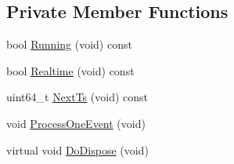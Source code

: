 \subsection*{Private Member Functions}
\begin{DoxyCompactItemize}
\item 
bool \hyperlink{classns3_1_1RealtimeSimulatorImpl_a02df477b10554442ed9d5049f9fca6ad}{Running} (void) const 
\item 
bool \hyperlink{classns3_1_1RealtimeSimulatorImpl_a1af563c7102edb90411971d8b1729488}{Realtime} (void) const 
\item 
uint64\+\_\+t \hyperlink{classns3_1_1RealtimeSimulatorImpl_ad2666b69c7f58599a68771e9d1544d26}{Next\+Ts} (void) const 
\item 
void \hyperlink{classns3_1_1RealtimeSimulatorImpl_ad30d0398ff4f58cb4896337169732c72}{Process\+One\+Event} (void)
\item 
virtual void \hyperlink{classns3_1_1RealtimeSimulatorImpl_a1a161c21705e49a2832fd5936db244ed}{Do\+Dispose} (void)
\end{DoxyCompactItemize}
